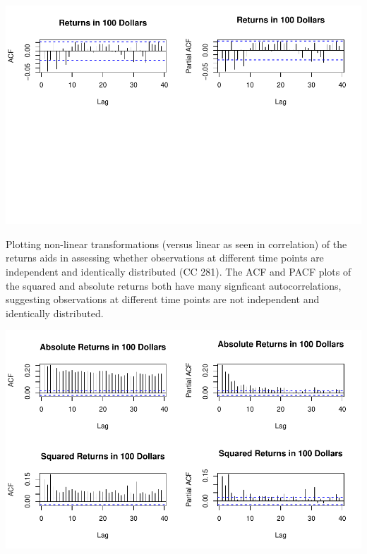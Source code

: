 \documentclass[11pt]{article}\usepackage[]{graphicx}\usepackage[]{color}
\makeatletter
\def\maxwidth{ %
  \ifdim\Gin@nat@width>\linewidth
    \linewidth
  \else
    \Gin@nat@width
  \fi
}
\newenvironment{knitrout}{}{} %
\makeatother
\begin{document}
\begin{knitrout}\footnotesize
{}\color{fgcolor}

{\centering \includegraphics[width=\maxwidth]{figure/assess_autocorr-1} 

}



\end{knitrout}
Plotting non-linear transformations (versus linear as seen in correlation) of the returns aids in assessing whether observations at different time points are independent and identically distributed (CC 281). The ACF and PACF plots of the squared and absolute returns both have many signficant autocorrelations, suggesting observations at different time points are not independent and identically distributed.

\begin{knitrout}\footnotesize
{}\color{fgcolor}

{\centering \includegraphics[width=\maxwidth]{figure/abs_plots-1} 

}



\end{knitrout}
\end{document}
